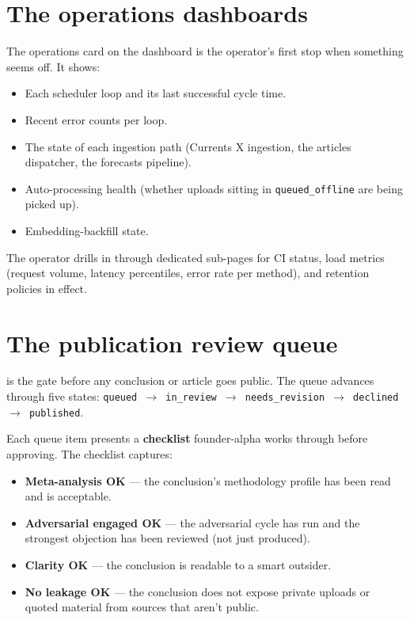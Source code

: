 \documentclass[11pt]{article}
\begin{document}

\section{The operations dashboards}

The operations card on the dashboard is the operator's first stop when
something seems off. It shows:

\begin{itemize}[leftmargin=*,itemsep=0.2em]
  \item Each scheduler loop and its last successful cycle time.
  \item Recent error counts per loop.
  \item The state of each ingestion path (Currents X ingestion, the
        articles dispatcher, the forecasts pipeline).
  \item Auto-processing health (whether uploads sitting in
        \texttt{queued\_offline} are being picked up).
  \item Embedding-backfill state.
\end{itemize}

The operator drills in through dedicated sub-pages for CI status,
load metrics (request volume, latency percentiles, error rate per
method), and retention policies in effect.

\section{The publication review queue}

 is the gate before any conclusion or article goes
public. The queue advances through five states: \texttt{queued $\to$
in\_review $\to$ needs\_revision $\to$ declined $\to$ published}.

Each queue item presents a \textbf{checklist} founder-alpha works
through before approving. The checklist captures:

\begin{itemize}[leftmargin=*,itemsep=0.2em]
  \item \textbf{Meta-analysis OK} --- the conclusion's methodology
        profile has been read and is acceptable.
  \item \textbf{Adversarial engaged OK} --- the adversarial cycle has
        run and the strongest objection has been reviewed (not just
        produced).
  \item \textbf{Clarity OK} --- the conclusion is readable to a smart
        outsider.
  \item \textbf{No leakage OK} --- the conclusion does not expose
        private uploads or quoted material from sources that aren't
        public.
\end{itemize}
\end{document}
